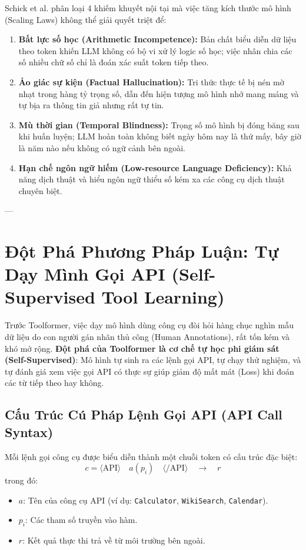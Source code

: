 \documentclass[11pt,a4paper]{article}
\begin{document}
\begin{coreconceptbox}
Schick et al. phân loại 4 khiếm khuyết nội tại mà việc tăng kích thước mô hình (Scaling Laws) không thể giải quyết triệt để:
\begin{enumerate}[leftmargin=1.5em]
    \item \textbf{Bất lực số học (Arithmetic Incompetence):} Bản chất biểu diễn dữ liệu theo token khiến LLM không có bộ vi xử lý logic số học; việc nhân chia các số nhiều chữ số chỉ là đoán xác suất token tiếp theo.
    \item \textbf{Ảo giác sự kiện (Factual Hallucination):} Tri thức thực tế bị nén mờ nhạt trong hàng tỷ trọng số, dẫn đến hiện tượng mô hình nhớ mang máng và tự bịa ra thông tin giả nhưng rất tự tin.
    \item \textbf{Mù thời gian (Temporal Blindness):} Trọng số mô hình bị đóng băng sau khi huấn luyện; LLM hoàn toàn không biết ngày hôm nay là thứ mấy, bây giờ là năm nào nếu không có ngữ cảnh bên ngoài.
    \item \textbf{Hạn chế ngôn ngữ hiếm (Low-resource Language Deficiency):} Khả năng dịch thuật và hiểu ngôn ngữ thiểu số kém xa các công cụ dịch thuật chuyên biệt.
\end{enumerate}
\end{coreconceptbox}

---

\section{Đột Phá Phương Pháp Luận: Tự Dạy Mình Gọi API (Self-Supervised Tool Learning)}

Trước Toolformer, việc dạy mô hình dùng công cụ đòi hỏi hàng chục nghìn mẫu dữ liệu do con người gán nhãn thủ công (Human Annotations), rất tốn kém và khó mở rộng. \textbf{Đột phá của Toolformer là cơ chế tự học phi giám sát (Self-Supervised)}: Mô hình tự sinh ra các lệnh gọi API, tự chạy thử nghiệm, và tự đánh giá xem việc gọi API có thực sự giúp giảm độ mất mát (Loss) khi đoán các từ tiếp theo hay không.

\subsection{Cấu Trúc Cú Pháp Lệnh Gọi API (API Call Syntax)}
Mỗi lệnh gọi công cụ được biểu diễn thành một chuỗi token có cấu trúc đặc biệt:
\begin{equation}
    c = \langle\text{API}\rangle \quad a(p_i) \quad \langle/\text{API}\rangle \quad \rightarrow \quad r
\end{equation}
trong đó:
\begin{itemize}[leftmargin=1.5em]
    \item $a$: Tên của công cụ API (ví dụ: \texttt{Calculator}, \texttt{WikiSearch}, \texttt{Calendar}).
    \item $p_i$: Các tham số truyền vào hàm.
    \item $r$: Kết quả thực thi trả về từ môi trường bên ngoài.
\end{itemize}
\end{document}
